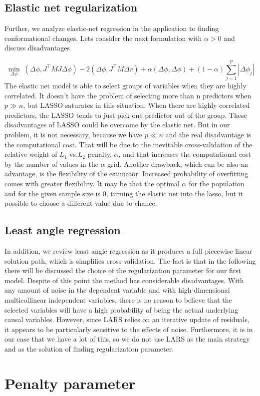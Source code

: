 \documentclass[12pt,twoside]{article}
\begin{document}
 \subsection{\small{Elastic net regularization}}
Further, we analyze elastic-net regression in the application to finding conformational changes.  Lets consider the next formulation with  $\alpha > 0$ and discuss disadvantages

$$\min_{\Delta \phi} \; (\Delta \phi, J^{\top}MJ \Delta \phi)-2(\Delta \phi, J^{\top}M\Delta r) + \alpha(\Delta \phi, \Delta \phi) + (1-\alpha)\sum\limits_{j=1}^{p} |\Delta\phi_j|$$
The elastic net model is able to select groups of variables when they are highly correlated. It doesn't have the problem of selecting more than n predictors when $p \gg n$, but LASSO saturates in this situation. When there are highly correlated predictors, the LASSO tends to just pick one predictor out of the group. These disadvantages of LASSO could be overcome by the elastic net. But in our problem, it is not necessary, because we have $p \ll n$ and the real disadvantage is the computational cost. That will be due to the inevitable cross-validation of the relative weight of $L_1$ vs.$L_2$ penalty, $\alpha$, and that increases the computational cost by the number of values in the $\alpha$ grid. Another drawback, which can be also an advantage, is the flexibility of the estimator. Increased probability of overfitting comes with greater flexibility. It may be that the optimal $\alpha$ for the population and for the given sample size is 0, turning the elastic net into the lasso, but it possible to choose a different value due to chance\cite{RePEc:bla:jorssb:v:67:y:2005:i:5:p:768-768}. 

 \subsection{\small{Least angle regression }}
In addition, we review least angle regression as it produces a full piecewise linear solution path, which is simplifies cross-validation. The fact is that in the following there will be discussed the choice of the regularization parameter for our first model. Despite of this point the method has considerable disadvantages. With any amount of noise in the dependent variable and with high-dimensional multicollinear independent variables, there is no reason to believe that the selected variables will have a high probability of being the actual underlying causal variables. However, since LARS relies on an iterative update of residuals, it appears to be particularly sensitive to the effects of noise\cite{efron2004least}.  Furthermore, it is in our case that we have a lot of this, so we do not use LARS as the main strategy and as the solution of finding regularization parameter. 

 \section{Penalty parameter}
 
 
        
\end{document}
